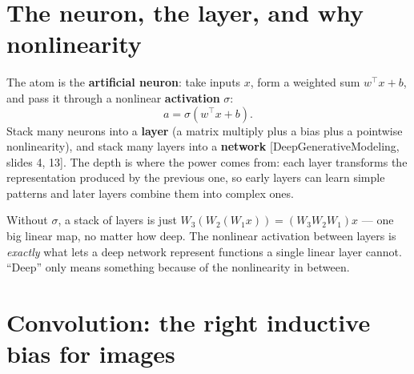 \documentclass[11pt]{article}
\newcommand{\deck}[1]{\textsf{\small[#1]}}
\begin{document}
\section{The neuron, the layer, and why nonlinearity}

The atom is the \textbf{artificial neuron}: take inputs $x$, form a weighted sum
$w^{\!\top}x + b$, and pass it through a nonlinear \textbf{activation} $\sigma$:
\[
a = \sigma\!\left(w^{\!\top}x + b\right).
\]
Stack many neurons into a \textbf{layer} (a matrix multiply plus a bias plus a
pointwise nonlinearity), and stack many layers into a \textbf{network}
\deck{DeepGenerativeModeling, slides 4, 13}. The depth is where the power comes
from: each layer transforms the representation produced by the previous one, so
early layers can learn simple patterns and later layers combine them into
complex ones.

\begin{keybox}
Without $\sigma$, a stack of layers is just $W_3(W_2(W_1 x))=(W_3W_2W_1)x$ --- one
big linear map, no matter how deep. The nonlinear activation between layers is
\emph{exactly} what lets a deep network represent functions a single linear layer
cannot. ``Deep'' only means something because of the nonlinearity in between.
\end{keybox}

\section{Convolution: the right inductive bias for images}
\end{document}
